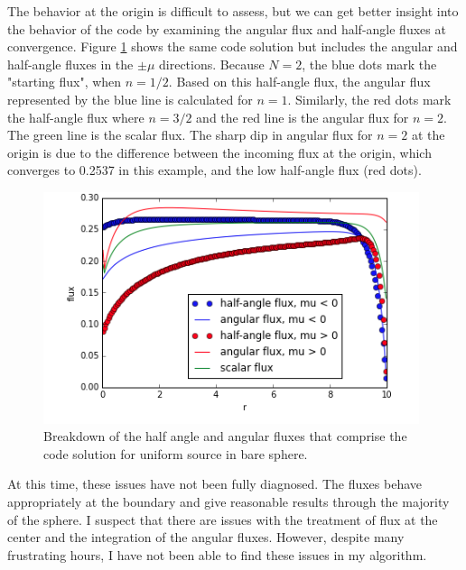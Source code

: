 \documentclass[11pt, oneside]{article}   	%
\begin{document}
The behavior at the origin is difficult to assess, but we can get better insight into the behavior of the code by examining the angular flux and half-angle fluxes at convergence. Figure  \ref{fig:detailed_flux_break_down} shows the same code solution but includes the angular and half-angle fluxes in the $\pm \mu$ directions. Because $N=2$, the blue dots mark the "starting flux", when $n=1/2$. Based on this half-angle flux, the angular flux represented by the blue line is calculated for $n=1$. Similarly, the red dots mark the half-angle flux where $n=3/2$ and the red line is the angular flux for $n=2$. The green line is the scalar flux. The sharp dip in angular flux for $n=2$ at the origin is due to the difference between the incoming flux at the origin, which converges to 0.2537 in this example, and the low half-angle flux (red dots).
%
\begin{figure}
\centering
\includegraphics[width=11cm]{uniform_src_detailed}
\caption{Breakdown of the half angle and angular fluxes that comprise the code solution for uniform source in bare sphere.}
\label{fig:detailed_flux_break_down}
\end{figure}

At this time, these issues have not been fully diagnosed. The fluxes behave appropriately at the boundary and give reasonable results through the majority of the sphere. I suspect that there are issues with the treatment of flux at the center and the integration of the angular fluxes. However, despite many frustrating hours, I have not been able to find these issues in my algorithm.
\end{document}
